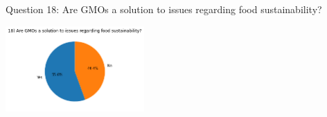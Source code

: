 \documentclass[11pt]{article}
\begin{document}
    \item{Question 18: Are GMOs a solution to issues regarding food sustainability?}
    \begin{center}
        \includegraphics[width=200]{ChanR EDA/q18}
    \end{center}
\end{document}
